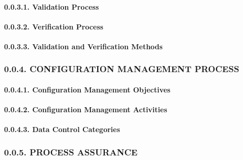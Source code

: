 \documentclass[
]{article}
\begin{document}
\hypertarget{validation-process}{%
\paragraph{0.0.3.1. Validation Process}\label{validation-process}}

\hypertarget{verification-process}{%
\paragraph{0.0.3.2. Verification Process}\label{verification-process}}

\hypertarget{validation-and-verification-methods}{%
\paragraph{0.0.3.3. Validation and Verification
Methods}\label{validation-and-verification-methods}}

\hypertarget{configuration-management-process}{%
\subsubsection{0.0.4. CONFIGURATION MANAGEMENT
PROCESS}\label{configuration-management-process}}

\hypertarget{configuration-management-objectives}{%
\paragraph{0.0.4.1. Configuration Management
Objectives}\label{configuration-management-objectives}}

\hypertarget{configuration-management-activities}{%
\paragraph{0.0.4.2. Configuration Management
Activities}\label{configuration-management-activities}}

\hypertarget{data-control-categories}{%
\paragraph{0.0.4.3. Data Control
Categories}\label{data-control-categories}}

\hypertarget{process-assurance}{%
\subsubsection{0.0.5. PROCESS ASSURANCE}\label{process-assurance}}
\end{document}

